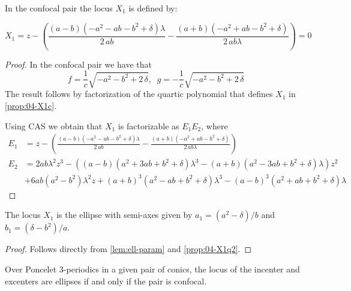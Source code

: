 \begin{proposition} In the confocal pair the locus $X_1$ is defined by:


 \[   X_1 =z-\left({\frac { \left( a-b \right)  \left( -{a}^{2}-a b-{b}^{2}+\delta
 \right) \lambda}{2\,a b}}-{\frac { \left( a+b \right)  \left( -{a}^{2}
+a b-{b}^{2}+\delta \right) }{2\,a b\lambda}}\right)=0\]
\label{prop:04-X1q2} 
\end{proposition}

\begin{proof} In the confocal pair 
we have that
\[f={\frac {1}{c}\sqrt {-{a}^{2}-{b}^{2}+2\,\delta}}, \;\; g= -{\frac {1}{c}\sqrt {-{a}^{2}-{b}^{2}+2\,\delta}}\]
The result follows by factorization of the quartic  polynomial that defines $X_1$ in \cref{prop:04-X1c}.

Using CAS we obtain that $X_1$ is factorizable as $E_1 E_2$, where
\begin{align*}
    E_1&=z-\left({\frac { \left( a-b \right)  \left( -{a}^{2}-a b-{b}^{2}+\delta
 \right) \lambda}{2\,a b}}-{\frac { \left( a+b \right)  \left( -{a}^{2}
+a b-{b}^{2}+\delta \right) }{2\,a b\lambda}}\right)
\\
    E_2&=2 a b \lambda^2 z^3 - ((a - b) (a^2 + 3 a b + b^2 + \delta) \lambda^3 - (a + b) (a^2 - 3 a b + b^2 + \delta) \lambda) z^2\\
    &+ 6 a b  (a^2 - b^2) \lambda^2 z + (a + b)^3 (a^2 - a b + b^2 + \delta) \lambda^3 - (a - b)^3 (a^2 + a b + b^2 + \delta) \lambda
\end{align*}
\end{proof}

\begin{corollary}
The locus $X_1$ is the ellipse with semi-axes given by $a_1=(a^2-\delta)/b$ and $b_1=(\delta-b^2)/a.$

 
\end{corollary}

\begin{proof}
Follows directly from  \cref{lem:ell-param} and  \cref{prop:04-X1q2}.
\end{proof}

\begin{conjecture}
Over Poncelet 3-periodics in a given pair of conics, the locus of the incenter and excenters are ellipses if and only if the pair is confocal.
\label{conj:04-incenter-excenter-loci}
\end{conjecture}

